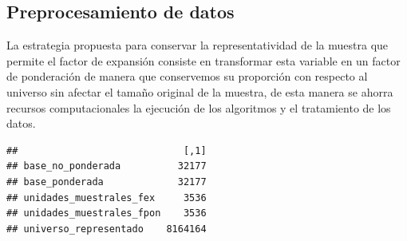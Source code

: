 \documentclass[
]{article}
\newenvironment{Shaded}{\begin{snugshade}}{\end{snugshade}}
\newcommand{\AttributeTok}[1]{\textcolor[rgb]{0.13,0.29,0.53}{#1}}
\newcommand{\FunctionTok}[1]{\textcolor[rgb]{0.13,0.29,0.53}{\textbf{#1}}}
\newcommand{\NormalTok}[1]{#1}
\newcommand{\OtherTok}[1]{\textcolor[rgb]{0.56,0.35,0.01}{#1}}
\newcommand{\SpecialCharTok}[1]{\textcolor[rgb]{0.81,0.36,0.00}{\textbf{#1}}}
\begin{document}
\hypertarget{preprocesamiento-de-datos}{%
\subsection{Preprocesamiento de datos}\label{preprocesamiento-de-datos}}

La estrategia propuesta para conservar la representatividad de la
muestra que permite el factor de expansión consiste en transformar esta
variable en un factor de ponderación de manera que conservemos su
proporción con respecto al universo sin afectar el tamaño original de la
muestra, de esta manera se ahorra recursos computacionales la ejecución
de los algoritmos y el tratamiento de los datos.

\begin{Shaded}
\end{Shaded}

\begin{verbatim}
##                             [,1]
## base_no_ponderada          32177
## base_ponderada             32177
## unidades_muestrales_fex     3536
## unidades_muestrales_fpon    3536
## universo_representado    8164164
\end{verbatim}
\end{document}
